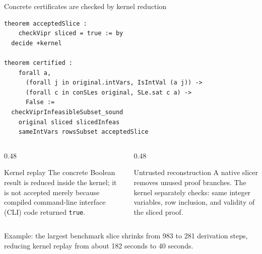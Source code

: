 \documentclass[aspectratio=169,11pt]{beamer}
\newcommand{\code}[1]{\texttt{#1}}
\begin{document}
\begin{frame}[fragile]{Concrete certificates are checked by kernel reduction}
\begin{lstlisting}[basicstyle=\ttfamily\tiny]
theorem acceptedSlice :
    checkVipr sliced = true := by
  decide +kernel

theorem certified :
    forall a,
      (forall j in original.intVars, IsIntVal (a j)) ->
      (forall c in conSLes original, SLe.sat c a) ->
      False :=
  checkViprInfeasibleSubset_sound
    original sliced slicedInfeas
    sameIntVars rowsSubset acceptedSlice
\end{lstlisting}

  \begin{columns}[T]
    \begin{column}{0.48\textwidth}
      \small
      \begin{block}{Kernel replay}
        The concrete Boolean result is reduced inside the kernel; it is not accepted
        merely because compiled command-line interface (CLI) code returned
        \code{true}.
      \end{block}
    \end{column}
    \begin{column}{0.48\textwidth}
      \small
      \begin{block}{Untrusted reconstruction}
        A native slicer removes unused proof branches. The kernel separately checks:
        same integer variables, row inclusion, and validity of the sliced proof.
      \end{block}
    \end{column}
  \end{columns}

  \vspace{0.1em}
  \small
  Example: the largest benchmark slice shrinks from 983 to 281 derivation steps,
  reducing kernel replay from about 182 seconds to 40 seconds.
\end{frame}
\end{document}
